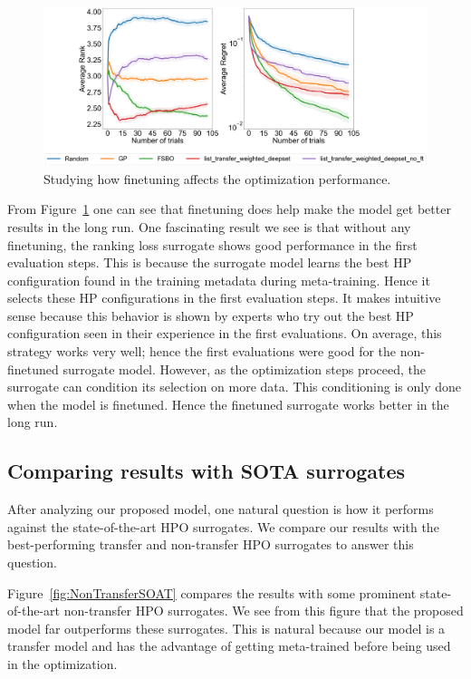 \documentclass[12pt, twoside, ngerman]{report}
\begin{document}
\begin{figure}[h]
  \centering
    \includegraphics[scale=0.25]{images/FineTuningAblation}
    \caption{Studying how finetuning affects the optimization performance.}
    \label{fig:FineTuningAblation}
\end{figure}

From Figure~\ref{fig:FineTuningAblation} one can see that finetuning does help make the model get better results in the long run.
One fascinating result we see is that without any finetuning, the ranking loss surrogate shows good performance in the first evaluation steps.
This is because the surrogate model learns the best HP configuration found in the training metadata during meta-training.
Hence it selects these HP configurations in the first evaluation steps.
It makes intuitive sense because this behavior is shown by experts who try out the best HP configuration seen in their experience in the first evaluations. On average, this strategy works very well; hence the first evaluations were good for the non-finetuned surrogate model.
However, as the optimization steps proceed, the surrogate can condition its selection on more data. This conditioning is only done when the model is finetuned. Hence the finetuned surrogate works better in the long run.

\subsection{Comparing results with SOTA surrogates}
After analyzing our proposed model, one natural question is how it performs against the state-of-the-art HPO surrogates. We compare our results with the best-performing transfer and non-transfer HPO surrogates to answer this question.

Figure~\ref{fig:NonTransferSOAT} compares the results with some prominent state-of-the-art non-transfer HPO surrogates. We see from this figure that the proposed model far outperforms these surrogates. This is natural because our model is a transfer model and has the advantage of getting meta-trained before being used in the optimization.
\end{document}
